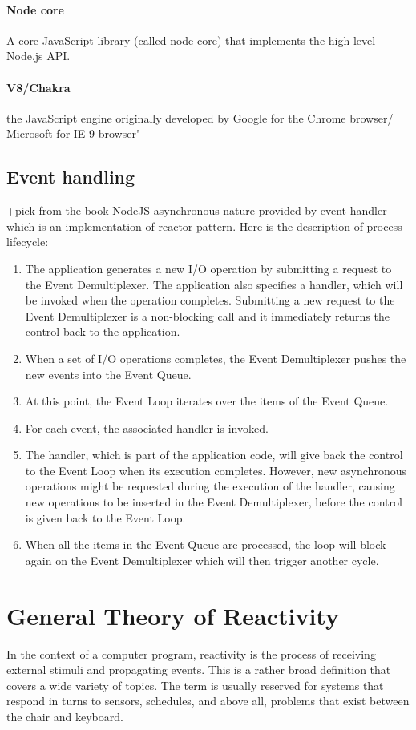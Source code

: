 \paragraph{Node core}
A core JavaScript library (called node-core) that implements the high-level Node.js API.

\paragraph{V8/Chakra} the JavaScript engine originally developed by Google for the Chrome browser/ Microsoft for IE 9 browser"\cite{nodejsbook} 

\subsection{Event handling}
+pick from the book
NodeJS asynchronous nature provided by event handler which is an implementation of reactor pattern. Here is the description of process lifecycle\cite{nodejsbook}:
\begin{enumerate}
\item The application generates a new I/O operation by submitting a request to the Event Demultiplexer. The application also specifies a handler, which will be invoked when the operation completes. Submitting a new request to the Event Demultiplexer is a non-blocking call and it immediately returns the control back to the application.
\item When a set of I/O operations completes, the Event Demultiplexer pushes the new events into the Event Queue.
\item At this point, the Event Loop iterates over the items of the Event Queue.
\item For each event, the associated handler is invoked.
\item The handler, which is part of the application code, will give back the control to the Event Loop when its execution completes. However, new asynchronous operations might be requested during the execution of the handler, causing new operations to be inserted in the Event Demultiplexer, before the control is given back to the Event Loop.
\item When all the items in the Event Queue are processed, the loop will block again on the Event Demultiplexer which will then trigger another cycle.
\end{enumerate}

\section{General Theory of Reactivity}
In the context of a computer program, reactivity is the process of receiving external stimuli and propagating events. This is a rather broad definition that covers a wide variety of topics. The term is usually reserved for systems that respond in turns to sensors, schedules, and above all, problems that exist between the chair and keyboard.

